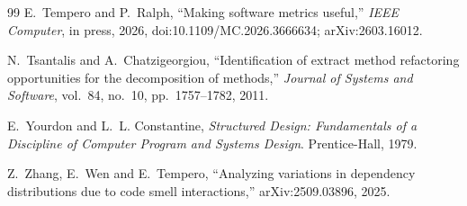 \documentclass[11pt,a4paper]{article}
\begin{document}
\begin{thebibliography}{99}
 E.~Tempero and P.~Ralph,
  ``Making software metrics useful,''
  \emph{IEEE Computer}, in press, 2026, doi:10.1109/MC.2026.3666634;
  arXiv:2603.16012.

 N.~Tsantalis and A.~Chatzigeorgiou,
  ``Identification of extract method refactoring opportunities for the
  decomposition of methods,'' \emph{Journal of Systems and Software},
  vol.~84, no.~10, pp.~1757--1782, 2011.

 E.~Yourdon and L.~L. Constantine,
  \emph{Structured Design: Fundamentals of a Discipline of Computer Program
  and Systems Design}. Prentice-Hall, 1979.

 Z.~Zhang, E.~Wen and E.~Tempero,
  ``Analyzing variations in dependency distributions due to code smell
  interactions,'' arXiv:2509.03896, 2025.

\end{thebibliography}
\end{document}
